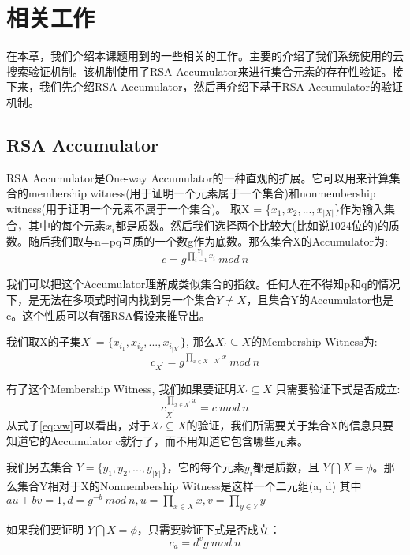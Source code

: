 \chapter{相关工作}
\label{chap:relatedwork}
在本章，我们介绍本课题用到的一些相关的工作。主要的介绍了我们系统使用的云搜索验证机制。该机制使用了RSA Accumulator\cite{goodrich2002efficient,verifiableindex}来进行集合元素的存在性验证。接下来，我们先介绍RSA Accumulator，然后再介绍下基于RSA Accumulator的验证机制。

\section{RSA Accumulator}
RSA Accumulator是One-way Accumulator\cite{benaloh1994one}的一种直观的扩展。它可以用来计算集合的membership witness(用于证明一个元素属于一个集合)和nonmembership witness(用于证明一个元素不属于一个集合)。
取X = \{$x_1, x_2, ... , x_{|X|}$\}作为输入集合，其中的每个元素$x_i$都是质数。然后我们选择两个比较大(比如说1024位的)的质数。随后我们取与n=pq互质的一个数g作为底数。那么集合X的Accumulator为:
\begin{equation} c = g^{\prod_{i = 1}^{|X|} x_i}\ mod\ n \end{equation}

我们可以把这个Accumulator理解成类似集合的指纹。任何人在不得知p和q的情况下，是无法在多项式时间内找到另一个集合$Y \neq X$，且集合Y的Accumulator也是c。这个性质可以有强RSA假设来推导出。

我们取X的子集$X^{\prime} = \{x_{i_1}, x_{i_2}, ... , x_{i_{|X^\prime}}\}$, 那么$X_\prime \subseteq X$的Membership Witness为:
\begin{equation} \label{eq:w} c_{X^\prime} = g^{\prod_{x \in X - X^\prime} x}\ mod\ n \end{equation}

有了这个Membership Witness, 我们如果要证明$X_\prime \subseteq X$ 只需要验证下式是否成立:
\begin{equation} \label{eq:vw} c_{X^\prime}^{\prod_{x \in X^\prime} x} = c\ mod\ n\end{equation}
从式子\ref{eq:vw}可以看出，对于$X_\prime \subseteq X$的验证，我们所需要关于集合X的信息只要知道它的Accumulator c就行了，而不用知道它包含哪些元素。

我们另去集合 $Y = \{y_1, y_2, ... , y_{|Y|}\}$，它的每个元素$y_i$都是质数，且 $Y \bigcap X = \phi$。那么集合Y相对于X的Nonmembership Witness是这样一个二元组(a, d) 其中
$au + bv = 1, d = g^{-b}\ mod\ n, u = \prod_{x \in X} x, v = \prod_{y \in Y} y$

如果我们要证明 $Y \bigcap X = \phi$，只需要验证下式是否成立：
\begin{equation} \label{eq:vnw} c_a = d^v g\ mod\ n \end{equation}

